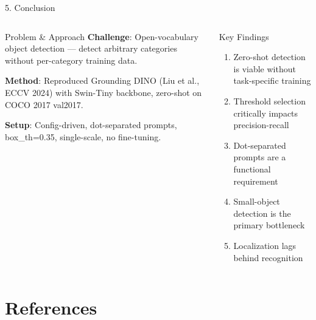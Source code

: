 \documentclass[aspectratio=169,10pt]{beamer}
\begin{document}
\begin{frame}{5. Conclusion}
  \vspace{-0.2cm}
  \begin{columns}[T]
    \begin{block}{Problem \& Approach}
      \footnotesize
      \textbf{Challenge}: Open-vocabulary object detection — detect arbitrary categories without per-category training data.

      \textbf{Method}: Reproduced Grounding DINO (Liu et al., ECCV 2024) with Swin-Tiny backbone, zero-shot on COCO 2017 val2017.

      \textbf{Setup}: Config-driven, dot-separated prompts, box\_th=0.35, single-scale, no fine-tuning.
    \end{block}

    \begin{block}{Key Findings}
      \footnotesize
      \begin{enumerate}\setlength{\itemsep}{2pt}
        \item Zero-shot detection is viable without task-specific training
        \item Threshold selection critically impacts precision-recall
        \item Dot-separated prompts are a functional requirement
        \item Small-object detection is the primary bottleneck
        \item Localization lags behind recognition
      \end{enumerate}
    \end{block}
  \end{columns}

  \vspace{0.15cm}
  \centering
\end{frame}

\section{References}
\end{document}
